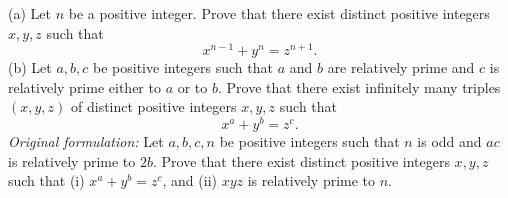 (a) Let $n$ be a positive integer. Prove that there exist distinct positive integers $x, y, z$ such that
\[ x^{n-1} + y^n = z^{n+1}. \]
(b) Let $a, b, c$ be positive integers such that $a$ and $b$ are relatively prime and $c$ is relatively prime either to $a$ or to $b$. Prove that there exist infinitely many triples $(x, y, z)$ of distinct positive integers $x, y, z$ such that
\[ x^a + y^b = z^c. \]
\textit{Original formulation:} Let $a, b, c, n$ be positive integers such that $n$ is odd and $ac$ is relatively prime to $2b$. Prove that there exist distinct positive integers $x, y, z$ such that
(i) $x^a + y^b = z^c$, and
(ii) $xyz$ is relatively prime to $n$.
